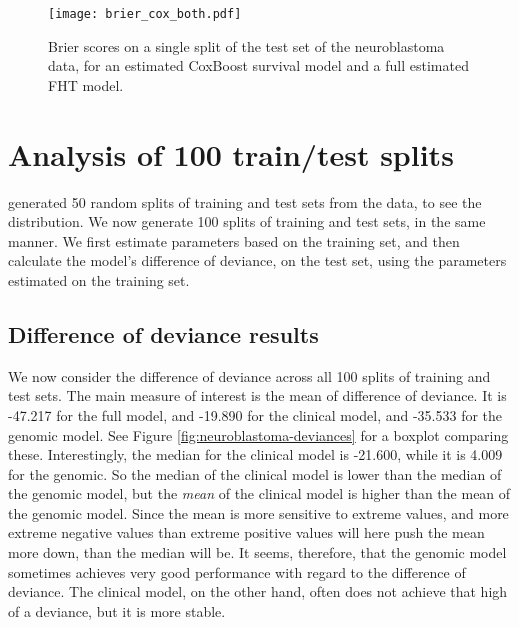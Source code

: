 \begin{figure}
\caption{Brier scores on a single split of the test set of the neuroblastoma data, for an estimated CoxBoost survival model and a full estimated FHT model.}
\label{fig:brier-cox-both}
\centering\texttt{[image: brier\_cox\_both.pdf]}
\end{figure}




\section{Analysis of 100 train/test splits}
\citet{bovelstad2009} generated 50 random splits of training and test sets from the data, to see the distribution.
We now generate 100 splits of training and test sets, in the same manner.
We first estimate parameters based on the training set, and then calculate the model's difference of deviance, on the test set, using the parameters estimated on the training set.

\subsection{Difference of deviance results}
We now consider the difference of deviance across all 100 splits of training and test sets.
The main measure of interest is the mean of difference of deviance.
It is -47.217 for the full model, and -19.890 for the clinical model, and -35.533 for the genomic model.
See Figure \ref{fig:neuroblastoma-deviances} for a boxplot comparing these.
Interestingly, the median for the clinical model is -21.600, while it is 4.009 for the genomic.
So the median of the clinical model is lower than the median of the genomic model, but the \textit{mean} of the clinical model is higher than the mean of the genomic model.
Since the mean is more sensitive to extreme values, and more extreme negative values than extreme positive values will here push the mean more down, than the median will be.
It seems, therefore, that the genomic model sometimes achieves very good performance with regard to the difference of deviance.
The clinical model, on the other hand, often does not achieve that high of a deviance, but it is more stable.


